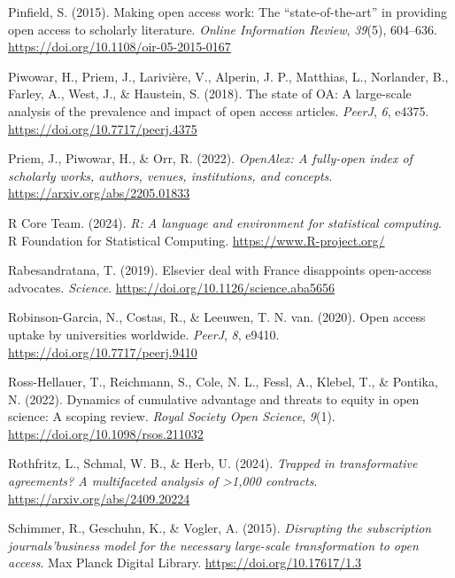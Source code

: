 \documentclass[a4paper,man,floatsintext,longtable,noextraspace,10pt]{apa6}
\newlength{\cslhangindent}
\newenvironment{CSLReferences}[2] %
{\begin{list}{}{%
  \setlength{\itemindent}{0pt}
  \setlength{\leftmargin}{0pt}
  \setlength{\parsep}{0pt}
  \ifodd #1
  \setlength{\leftmargin}{\cslhangindent}
  \setlength{\itemindent}{-1\cslhangindent}
  \fi
  \setlength{\itemsep}{#2\baselineskip}}}
{\end{list}}
\begin{document}
\begin{CSLReferences}{1}{0}
Pinfield, S. (2015). Making open access work: The {``state-of-the-art''}
in providing open access to scholarly literature. \emph{Online
Information Review}, \emph{39}(5), 604--636.
\url{https://doi.org/10.1108/oir-05-2015-0167}

Piwowar, H., Priem, J., Larivière, V., Alperin, J. P., Matthias, L.,
Norlander, B., Farley, A., West, J., \& Haustein, S. (2018). The state
of {OA}: A large-scale analysis of the prevalence and impact of open
access articles. \emph{{PeerJ}}, \emph{6}, e4375.
\url{https://doi.org/10.7717/peerj.4375}

Priem, J., Piwowar, H., \& Orr, R. (2022). \emph{OpenAlex: A fully-open
index of scholarly works, authors, venues, institutions, and concepts}.
\url{https://arxiv.org/abs/2205.01833}

R Core Team. (2024). \emph{R: A language and environment for statistical
computing}. R Foundation for Statistical Computing.
\url{https://www.R-project.org/}

Rabesandratana, T. (2019). Elsevier deal with {France} disappoints
open-access advocates. \emph{Science}.
\url{https://doi.org/10.1126/science.aba5656}

Robinson-Garcia, N., Costas, R., \& Leeuwen, T. N. van. (2020). Open
access uptake by universities worldwide. \emph{{PeerJ}}, \emph{8},
e9410. \url{https://doi.org/10.7717/peerj.9410}

Ross-Hellauer, T., Reichmann, S., Cole, N. L., Fessl, A., Klebel, T., \&
Pontika, N. (2022). Dynamics of cumulative advantage and threats to
equity in open science: A scoping review. \emph{Royal Society Open
Science}, \emph{9}(1). \url{https://doi.org/10.1098/rsos.211032}

Rothfritz, L., Schmal, W. B., \& Herb, U. (2024). \emph{Trapped in
transformative agreements? A multifaceted analysis of \textgreater1,000
contracts}. \url{https://arxiv.org/abs/2409.20224}

Schimmer, R., Geschuhn, K., \& Vogler, A. (2015). \emph{{Disrupting the
subscription journals'business model for the necessary large-scale
transformation to open access}}. Max Planck Digital Library.
\url{https://doi.org/10.17617/1.3}


\end{CSLReferences}
\end{document}
